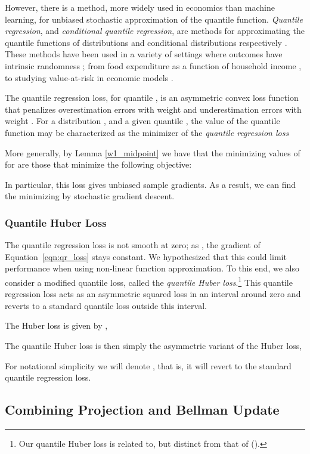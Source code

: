 \documentclass[letterpaper]{article}
\newcommand{\citet}[1]{\citeauthor{#1} (\citeyear{#1})}
\begin{document}
However, there is a method, more widely used in economics than machine learning, for unbiased stochastic approximation of the quantile function. \textit{Quantile regression}, and \textit{conditional quantile regression}, are methods for approximating the quantile functions of distributions and conditional distributions respectively \cite{qrbook}. These methods have been used in a variety of settings where outcomes have intrinsic randomness \cite{koenker2001quantile}; from food expenditure as a function of household income \cite{engel1857productions}, to studying value-at-risk in economic models \cite{taylor1999quantile}.

The quantile regression loss, for quantile , is an asymmetric convex loss function that penalizes overestimation errors with weight  and underestimation errors with weight . For a distribution , and a given quantile , the value of the quantile function  may be characterized as the minimizer of the \emph{quantile regression loss}

More generally, by Lemma \ref{w1_midpoint} we have that the minimizing values of  for  are those that minimize the following objective:


In particular, this loss gives unbiased sample gradients. As a result, we can find the minimizing  by stochastic gradient descent. 

\subsubsection{Quantile Huber Loss}
The quantile regression loss is not smooth at zero; as , the gradient of Equation~\ref{eqn:qr_loss} stays constant. We hypothesized that this could limit performance when using non-linear function approximation. To this end, we also consider a modified quantile loss, called the \textit{quantile Huber loss}.\footnote{Our quantile Huber loss is related to, but distinct from that of \citet{aravkin2014sparse}.} This quantile regression loss acts as an asymmetric squared loss in an interval  around zero and reverts to a standard quantile loss outside this interval.

The Huber loss is given by \cite{huber1964robust},

The quantile Huber loss is then simply the asymmetric variant of the Huber loss,

For notational simplicity we will denote , that is, it will revert to the standard quantile regression loss.

\subsection{Combining Projection and Bellman Update}
\end{document}
